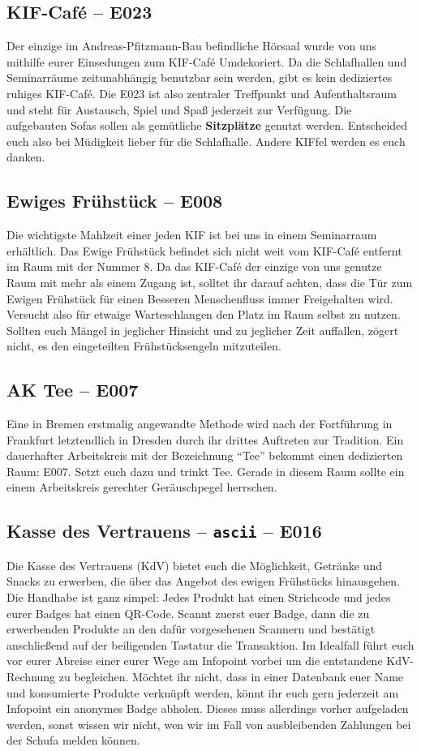 \subsection*{KIF-Café -- E023}
Der einzige im Andreas-Pfitzmann-Bau befindliche Hörsaal wurde von uns mithilfe eurer Einsedungen zum KIF-Café Umdekoriert.
Da die Schlafhallen und Seminarräume zeitunabhängig benutzbar sein werden, gibt es kein dediziertes ruhiges KIF-Café.
Die E023 ist also zentraler Treffpunkt und Aufenthaltsraum und steht für Austausch, Spiel und Spaß jederzeit zur Verfügung.
Die aufgebauten Sofas sollen als gemütliche \textbf{Sitzplätze} genutzt werden.
Entscheided euch also bei Müdigkeit lieber für die Schlafhalle.
Andere KIFfel werden es euch danken.

\subsection*{Ewiges Frühstück -- E008}
Die wichtigste Mahlzeit einer jeden KIF ist bei uns in einem Seminarraum erhältlich.
Das Ewige Frühstück befindet sich nicht weit vom KIF-Café entfernt im Raum mit der Nummer 8.
Da das KIF-Café der einzige von uns genutze Raum mit mehr als einem Zugang ist, solltet ihr darauf achten, dass die Tür zum Ewigen Frühstück für einen Besseren Menschenfluss immer Freigehalten wird.
Versucht also für etwaige Warteschlangen den Platz im Raum selbst zu nutzen.
Sollten euch Mängel in jeglicher Hinsicht und zu jeglicher Zeit auffallen, zögert nicht, es den eingeteilten Frühstücksengeln mitzuteilen.

\subsection*{AK Tee -- E007}
Eine in Bremen erstmalig angewandte Methode wird nach der Fortführung in Frankfurt letztendlich in Dresden durch ihr drittes Auftreten zur Tradition.
Ein dauerhafter Arbeitskreis mit der Bezeichnung \enquote{Tee} bekommt einen dedizierten Raum: E007.
Setzt euch dazu und trinkt Tee.
Gerade in diesem Raum sollte ein einem Arbeitskreis gerechter Geräuschpegel herrschen.

\subsection*{Kasse des Vertrauens -- \texttt{ascii} -- E016}
Die Kasse des Vertrauens (KdV) bietet euch die Möglichkeit, Getränke und Snacks zu erwerben, die über das Angebot des ewigen Frühstücks hinausgehen.
Die Handhabe ist ganz simpel: Jedes Produkt hat einen Strichcode und jedes eurer Badges hat einen QR-Code.
Scannt zuerst euer Badge, dann die zu erwerbenden Produkte an den dafür vorgesehenen Scannern und bestätigt anschließend auf der beiligenden Tastatur die Transaktion.
Im Idealfall führt euch vor eurer Abreise einer eurer Wege am Infopoint vorbei um die entstandene KdV-Rechnung zu begleichen.
Möchtet ihr nicht, dass in einer Datenbank euer Name und konsumierte Produkte verknüpft werden, könnt ihr euch gern jederzeit am Infopoint ein anonymes Badge abholen.
Dieses muss allerdings vorher aufgeladen werden, sonst wissen wir nicht, wen wir im Fall von ausbleibenden Zahlungen bei der Schufa melden können.

